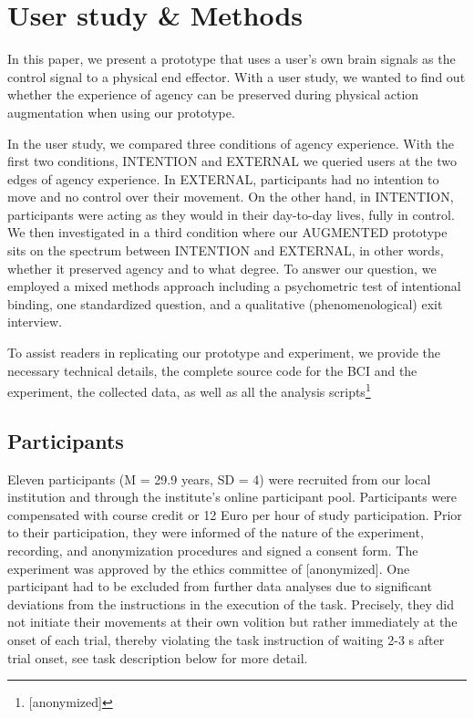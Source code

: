 
\section{User study \& Methods}
In this paper, we present a prototype that uses a user's own brain signals as the control signal to a physical end effector. With a user study, we wanted to find out whether the experience of agency can be preserved during physical action augmentation when using our prototype. 

In the user study, we compared three conditions of agency experience. With the first two conditions, INTENTION and EXTERNAL we queried users at the two edges of agency experience. In EXTERNAL, participants had no intention to move and no control over their movement. On the other hand, in INTENTION, participants were acting as they would in their day-to-day lives, fully in control. We then investigated in a third condition where our AUGMENTED prototype sits on the spectrum between INTENTION and EXTERNAL, in other words, whether it preserved agency and to what degree. To answer our question, we employed a mixed methods approach including a psychometric test of intentional binding, one standardized question, and a qualitative (phenomenological) exit interview.

To assist readers in replicating our prototype and experiment, we provide the necessary technical details, the complete source code for the BCI and the experiment, the collected data, as well as all the analysis scripts\footnote{[anonymized]}

\subsection{Participants}
Eleven participants (M = 29.9 years, SD = 4) were recruited from our local institution and through the institute's online participant pool. Participants were compensated with course credit or 12 Euro per hour of study participation. Prior to their participation, they were informed of the nature of the experiment, recording, and anonymization procedures and signed a consent form. The experiment was approved by the ethics committee of [anonymized]. One participant had to be excluded from further data analyses due to significant deviations from the instructions in the execution of the task. Precisely, they did not initiate their movements at their own volition but rather immediately at the onset of each trial, thereby violating the task instruction of waiting 2-3 s after trial onset, see task description below for more detail.

